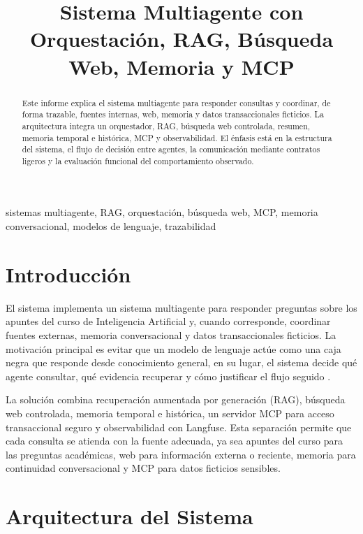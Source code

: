 \documentclass[conference]{IEEEtran}
\title{Sistema Multiagente con Orquestación, RAG, Búsqueda Web, Memoria y MCP}
\author{
\IEEEauthorblockN{Emmanuel Rodriguez Rivas\\
José Miguel González Barrantes\\
Fabricio Picado Alvarado
}
\IEEEauthorblockA{
Curso de Inteligencia Artificial\\
Instituto Tecnológico de Costa Rica}
}
\begin{document}
\maketitle

\begin{abstract}
Este informe explica el sistema multiagente para responder consultas y coordinar, de forma trazable, fuentes internas, web, memoria y datos transaccionales ficticios. La arquitectura integra un orquestador, RAG, búsqueda web controlada, resumen, memoria temporal e histórica, MCP y observabilidad. El énfasis está en la estructura del sistema, el flujo de decisión entre agentes, la comunicación mediante contratos ligeros y la evaluación funcional del comportamiento observado.
\end{abstract}

\begin{IEEEkeywords}
sistemas multiagente, RAG, orquestación, búsqueda web, MCP, memoria conversacional, modelos de lenguaje, trazabilidad
\end{IEEEkeywords}

\section{Introducción}

El sistema implementa un sistema multiagente para responder preguntas sobre los apuntes del curso de Inteligencia Artificial y, cuando corresponde, coordinar fuentes externas, memoria conversacional y datos transaccionales ficticios. La motivación principal es evitar que un modelo de lenguaje actúe como una caja negra que responde desde conocimiento general, en su lugar, el sistema decide qué agente consultar, qué evidencia recuperar y cómo justificar el flujo seguido \cite{wooldridge1995intelligent,shoham2008multiagent}.

La solución combina recuperación aumentada por generación (RAG), búsqueda web controlada, memoria temporal e histórica, un servidor MCP para acceso transaccional seguro y observabilidad con Langfuse. Esta separación permite que cada consulta se atienda con la fuente adecuada, ya sea apuntes del curso para las preguntas académicas, web para información externa o reciente, memoria para continuidad conversacional y MCP para datos ficticios sensibles.
\section{Arquitectura del Sistema}
\end{document}
